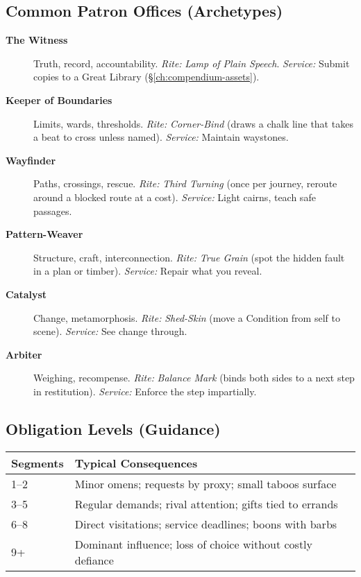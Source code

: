 \begin{multicols}{2}
\subsection*{Common Patron Offices (Archetypes)}
\begin{description}
  \item[\textbf{The Witness}] Truth, record, accountability. \emph{Rite:} \emph{Lamp of Plain Speech}. \emph{Service:} Submit copies to a Great Library (\S\ref{ch:compendium-assets}).
  \item[\textbf{Keeper of Boundaries}] Limits, wards, thresholds. \emph{Rite:} \emph{Corner-Bind} (draws a chalk line that takes a beat to cross unless named). \emph{Service:} Maintain waystones. 
  \item[\textbf{Wayfinder}] Paths, crossings, rescue. \emph{Rite:} \emph{Third Turning} (once per journey, reroute around a blocked route at a cost). \emph{Service:} Light cairns, teach safe passages.
  \item[\textbf{Pattern-Weaver}] Structure, craft, interconnection. \emph{Rite:} \emph{True Grain} (spot the hidden fault in a plan or timber). \emph{Service:} Repair what you reveal.
  \item[\textbf{Catalyst}] Change, metamorphosis. \emph{Rite:} \emph{Shed-Skin} (move a Condition from self to scene). \emph{Service:} See change through.
  \item[\textbf{Arbiter}] Weighing, recompense. \emph{Rite:} \emph{Balance Mark} (binds both sides to a next step in restitution). \emph{Service:} Enforce the step impartially.
\end{description}

\subsection*{Obligation Levels (Guidance)}
\begin{center}
\small
\begin{tabular}{ll}
\toprule
\textbf{Segments} & \textbf{Typical Consequences} \\
\midrule
1--2 & Minor omens; requests by proxy; small taboos surface \\
3--5 & Regular demands; rival attention; gifts tied to errands \\
6--8 & Direct visitations; service deadlines; boons with barbs \\
9+  & Dominant influence; loss of choice without costly defiance \\
\bottomrule
\end{tabular}
\end{center}


\end{multicols}
